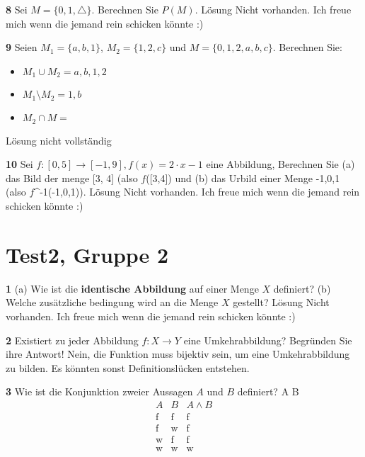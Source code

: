 \documentclass[11pt]{article}
\begin{document}
    \textbf{8} Sei \( M = \{0, 1, \triangle\} \). Berechnen Sie \( P(M) \).\newline
    Lösung Nicht vorhanden. Ich freue mich wenn die jemand rein schicken könnte :)\newline

    \textbf{9} Seien \( M_1 = \{a, b, 1\} \), \( M_2 = \{1, 2, c\} \) und \( M = \{0, 1, 2, a, b, c\} \). Berechnen Sie:
    \begin{itemize}
        \item \( M_1 \cup M_2 = {a,b,1,2}\)
        \item \( M_1 \setminus M_2 = {1,b}\)
        \item \( M_2 \cap M =\)
    \end{itemize}\newline
    Lösung nicht vollständig\newline

\textbf{10} Sei $f : [0,5] \rightarrow [-1,9], f(x) = 2 \cdot x - 1$ eine Abbildung, Berechnen Sie (a) das Bild der menge [3, 4] (also $f$([3,4]) und (b) das Urbild einer Menge {-1,0,1} (also $f$^{-1}({-1,0,1})).\newline
    Lösung Nicht vorhanden. Ich freue mich wenn die jemand rein schicken könnte :)\newline

\section{Test2, Gruppe 2}

    \textbf{1} (a) Wie ist die \textbf{identische Abbildung} auf einer Menge $X$ definiert? (b) Welche zusätzliche bedingung wird an die Menge $X$ gestellt?\newline
    Lösung Nicht vorhanden. Ich freue mich wenn die jemand rein schicken könnte :)\newline

    \textbf{2} Existiert zu jeder Abbildung $f : X \rightarrow Y $ eine Umkehrabbildung? Begründen Sie ihre Antwort!\newline
    Nein, die Funktion muss bijektiv sein, um eine Umkehrabbildung zu bilden. Es könnten sonst Definitionslücken entstehen.\newline

    \textbf{3} Wie ist die Konjunktion zweier Aussagen $A$ und $B$ definiert?\newline
    A \land B 
    \[
        \begin{array}{c|c|c}
            A & B & A \land B \\
            \hline
            \text{f} & \text{f} & \text{f} \\
            \text{f} & \text{w} & \text{f} \\
            \text{w} & \text{f} & \text{f} \\
            \text{w} & \text{w} & \text{w} \\
        \end{array}
    \]\newline\newline
\end{document}
